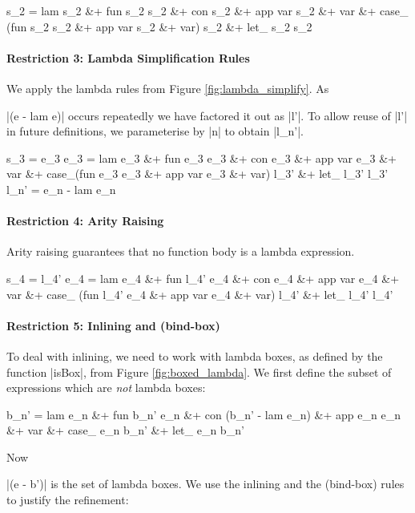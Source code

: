 \ignore\begin{code}
s_2  =  lam s_2 &+ fun s_2 s_2 &+ con s_2 &+ app var s_2 &+ var &+
        case_ (fun s_2 s_2 &+ app var s_2 &+ var) s_2 &+ let_ s_2 s_2
\end{code}

\paragraph{Restriction 3: Lambda Simplification Rules}
We apply the lambda rules from Figure \ref{fig:lambda_simplify}. As \ignore|(e - lam e)| occurs repeatedly we have factored it out as |l'|. To allow reuse of |l'| in future definitions, we parameterise by |n| to obtain |l_n'|.

\ignore\begin{code}
s_3   =  e_3
e_3   =  lam e_3 &+ fun e_3 e_3 &+ con e_3 &+ app var e_3 &+ var &+
         case_(fun e_3 e_3 &+ app var e_3 &+ var) l_3' &+ let_ l_3' l_3'
l_n'  =  e_n - lam e_n
\end{code}

\paragraph{Restriction 4: Arity Raising}
Arity raising guarantees that no function body is a lambda expression.

\ignore\begin{code}
s_4   =  l_4'
e_4   =  lam e_4 &+ fun l_4' e_4 &+ con e_4 &+ app var e_4 &+ var &+
         case_ (fun l_4' e_4 &+ app var e_4 &+ var) l_4' &+ let_ l_4' l_4'
\end{code}

\paragraph{Restriction 5: Inlining and (bind-box)}
To deal with inlining, we need to work with lambda boxes, as defined by the function |isBox|, from Figure \ref{fig:boxed_lambda}. We first define the subset of expressions which are \textit{not} lambda boxes:

\ignore\begin{code}
b_n'  =  lam e_n &+ fun b_n' e_n &+ con (b_n' - lam e_n) &+ app e_n e_n &+ var &+
         case_ e_n b_n' &+ let_ e_n b_n'
\end{code}

Now \ignore|(e - b')| is the set of lambda boxes. We use the inlining and the (bind-box) rules to justify the refinement:

